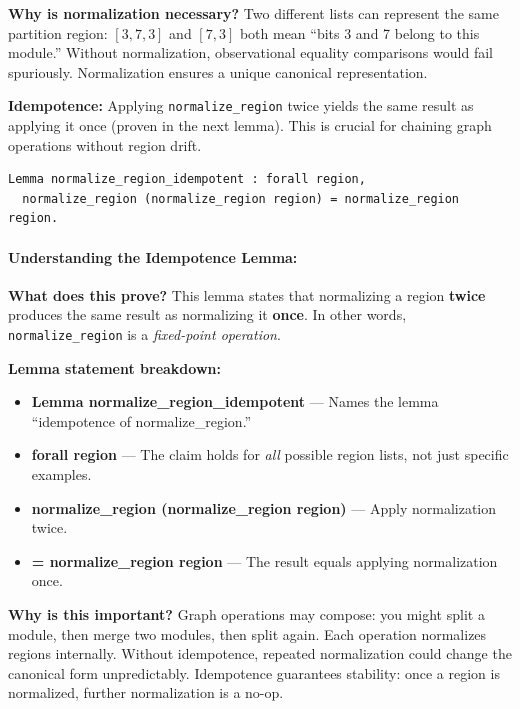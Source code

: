 \textbf{Why is normalization necessary?} Two different lists can represent the same partition region: $[3, 7, 3]$ and $[7, 3]$ both mean ``bits 3 and 7 belong to this module.'' Without normalization, observational equality comparisons would fail spuriously. Normalization ensures a unique canonical representation.


\textbf{Idempotence:} Applying \texttt{normalize\_region} twice yields the same result as applying it once (proven in the next lemma). This is crucial for chaining graph operations without region drift.

\begin{theorem}[Idempotence]
\begin{lstlisting}
Lemma normalize_region_idempotent : forall region,
  normalize_region (normalize_region region) = normalize_region region.
\end{lstlisting}
\end{theorem}

\paragraph{Understanding the Idempotence Lemma:}

\textbf{What does this prove?} This lemma states that normalizing a region \textbf{twice} produces the same result as normalizing it \textbf{once}. In other words, \texttt{normalize\_region} is a \textit{fixed-point operation}.

\textbf{Lemma statement breakdown:}
\begin{itemize}
    \item \textbf{Lemma normalize\_region\_idempotent} — Names the lemma ``idempotence of normalize\_region.''
    \item \textbf{forall region} — The claim holds for \textit{all} possible region lists, not just specific examples.
    \item \textbf{normalize\_region (normalize\_region region)} — Apply normalization twice.
    \item \textbf{= normalize\_region region} — The result equals applying normalization once.
\end{itemize}

\textbf{Why is this important?} Graph operations may compose: you might split a module, then merge two modules, then split again. Each operation normalizes regions internally. Without idempotence, repeated normalization could change the canonical form unpredictably. Idempotence guarantees stability: once a region is normalized, further normalization is a no-op.

